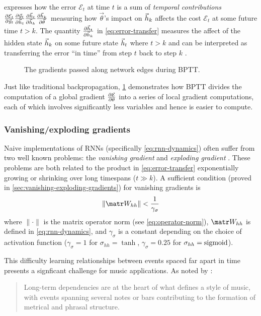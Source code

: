  expresses how the error $\mathcal{E}_t$ at time $t$ is a sum
of \emph{temporal contributions} $
\frac{\partial \mathcal{E}_t}{\partial \vec{y}_t}
\frac{\partial \vec{y}_t}{\partial \vec{h}_t}
\frac{\partial \vec{h}_t}{\partial \vec{h}_k}
\frac{\partial \vec{h}_k}{\partial \vec{\theta}}$
measuring how $\vec{\theta}$'s impact on $\vec{h}_k$ affects the cost
$\mathcal{E}_t$ at some future time $t > k$. The quantity
$\frac{\partial \vec{h}_t}{\partial \vec{h}_k}$ in \cref{eq:error-transfer} measures the affect of
the hidden state $\vec{h}_k$ on some future state $\vec{h}_t$ where $t > k$ and can be
interpreted as transferring the error ``in time'' from step $t$ back to step
$k$ \citep{Pascanu2012}.

\begin{figure}[tb]
    \centering
    
    \caption{The gradients passed along network edges during BPTT.}
    \label{fig:rnn-bptt}
\end{figure}

Just like traditional backpropagation, \cref{fig:rnn-bptt} demonstrates how
BPTT divides the computation of a global gradient $\frac{\partial \mathcal{E}}{\partial
\theta}$ into a series of local gradient computations, each of which involves
significantly less variables and hence is easier to compute.

\subsubsection{Vanishing/exploding gradients}

Naive implementations of RNNs (specifically \cref{eq:rnn-dynamics}) often
suffer from two well known problems: the \emph{vanishing gradient} and
\emph{exploding gradient} \citep{Bengio1994}. These problems are both related
to the product in \cref{eq:error-transfer} exponentially growing or shrinking
over long timespans (\ie $t \gg k$). A sufficient condition (proved in
\vref{sec:vanishing-exploding-gradients}) for vanishing gradients is
\begin{equation}\label{eq:vanishing-gradients-suff}
  \left\| \W_{hh} \right\| < \frac{1}{\gamma_\sigma}
\end{equation}
where $\| \cdot \|$ is the matrix operator norm (see \vref{eq:operator-norm}),
$\W_{hh}$ is defined in \vref{eq:rnn-dynamics},
and $\gamma_\sigma$ is a constant depending on the choice of activation function
(\eg $\gamma_\sigma = 1$ for $\sigma_{hh} = \tanh$, $\gamma_\sigma = 0.25$ for
$\sigma_{hh} = \operatorname*{sigmoid}$).

This difficulty learning relationships between events spaced far apart in time
presents a signficant challenge for music applications. As noted by
\citet{cooper1963rhythmic}:
\begin{quote}
  Long-term dependencies are at the heart of what defines a style of music, with
  events spanning several notes or bars contributing to the formation of metrical and phrasal
  structure.
\end{quote}


